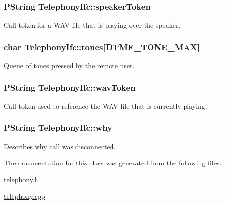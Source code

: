 \hypertarget{classTelephonyIfc_fa97c7205d0ade2e6cc21f9f1b1466bc}{
\subsubsection[{speakerToken}]{\setlength{\rightskip}{0pt plus 5cm}PString {\bf TelephonyIfc::speakerToken}}}
\label{classTelephonyIfc_fa97c7205d0ade2e6cc21f9f1b1466bc}


Call token for a WAV file that is playing over the speaker. 

\hypertarget{classTelephonyIfc_8c18969f7ee88659b8b118c530f79bcd}{
\subsubsection[{tones}]{\setlength{\rightskip}{0pt plus 5cm}char {\bf TelephonyIfc::tones}\mbox{[}DTMF\_\-TONE\_\-MAX\mbox{]}}}
\label{classTelephonyIfc_8c18969f7ee88659b8b118c530f79bcd}


Queue of tones pressed by the remote user. 

\hypertarget{classTelephonyIfc_54799c28302aba6f7adb8c8ef438503e}{
\subsubsection[{wavToken}]{\setlength{\rightskip}{0pt plus 5cm}PString {\bf TelephonyIfc::wavToken}}}
\label{classTelephonyIfc_54799c28302aba6f7adb8c8ef438503e}


Call token used to reference the WAV file that is currently playing. 

\hypertarget{classTelephonyIfc_f41ebe765b20a522ebd9c493c3bf77eb}{
\subsubsection[{why}]{\setlength{\rightskip}{0pt plus 5cm}PString {\bf TelephonyIfc::why}}}
\label{classTelephonyIfc_f41ebe765b20a522ebd9c493c3bf77eb}


Describes why call was disconnected. 



The documentation for this class was generated from the following files:\begin{CompactItemize}
\item 
\hyperlink{telephony_8h}{telephony.h}\item 
\hyperlink{telephony_8cpp}{telephony.cpp}\end{CompactItemize}
